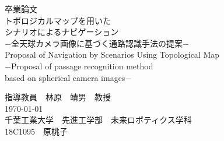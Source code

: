 \documentclass[../main]{subfiles}
\begin{document}
  \begin{titlepage}
    \begin{center}
      \vspace*{1cm}
      {\huge  卒業論文}\\
      \vspace{2cm}
      {\huge トポロジカルマップを用いた\\シナリオによるナビゲーション\\
      \vspace{1cm}
      −全天球カメラ画像に基づく通路認識手法の提案−}\\
      \vspace{1cm}
     {\huge Proposal of Navigation by Scenarios Using Topological Map\\
     −Proposal of passage recognition method \\based on spherical camera images−}

      \vspace{4cm}
      \vspace{1cm}
      {\LARGE 指導教員　林原　靖男　教授}\\
      \vspace{2cm}
      {\LARGE \today}\\
      \vspace{1cm}
      {\LARGE 千葉工業大学　先進工学部　未来ロボティクス学科}\\
      \vspace{1cm}
      {\LARGE 18C1095　原桃子}\\
    \end{center}
  \end{titlepage}
\end{document}
